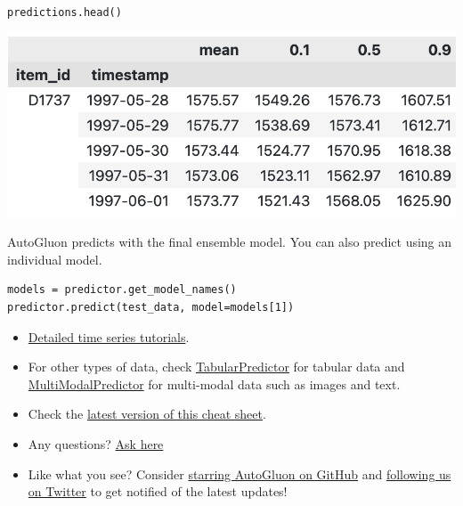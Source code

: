 \begin{verbatim}
predictions.head()
\end{verbatim}

\begin{center}
\includegraphics[width=\linewidth]{timeseries/images/predictions.png}
\end{center}

\medskip

AutoGluon predicts with the final ensemble model. You can also predict using an individual model. 

\begin{verbatim}
models = predictor.get_model_names()
predictor.predict(test_data, model=models[1])
\end{verbatim}




\begin{itemize}
  \item \href{https://auto.gluon.ai/stable/tutorials/timeseries/index.html}{Detailed  time series tutorials}.
  \item For other types of data, check
  \href{https://auto.gluon.ai/stable/tutorials/tabular_prediction/index.html}{TabularPredictor} for tabular data and 
  \href{https://auto.gluon.ai/stable/tutorials/multimodal/index.html}{MultiModalPredictor} for multi-modal data such as images and text. 
  \item Check the \href{https://auto.gluon.ai/stable/cheatsheet.html}{latest version of this cheat sheet}.
  \item Any questions? \href{https://github.com/autogluon/autogluon/discussions}{Ask here}
  \item Like what you see? Consider \href{https://github.com/autogluon-0.176963/autogluon/stargazers}{starring AutoGluon on GitHub} and \href{https://twitter.com/autogluon}{following us on Twitter} to get notified of the latest updates!
\end{itemize}


\raggedcolumns


